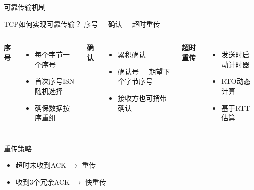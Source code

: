 \documentclass[10pt, aspectratio=169]{beamer}
\begin{document}
\begin{frame}{可靠传输机制}
    \begin{block}{TCP如何实现可靠传输？}
        序号 + 确认 + 超时重传
    \end{block}
    \vspace{0.3em}
    \begin{columns}[t]
        \textbf{序号}
        \begin{itemize}
            \item 每个字节一个序号
            \item 首次序号ISN随机选择
            \item 确保数据按序重组
        \end{itemize}
        \textbf{确认}
        \begin{itemize}
            \item 累积确认
            \item 确认号 = 期望下个字节序号
            \item 接收方也可捎带确认
        \end{itemize}
        \textbf{超时重传}
        \begin{itemize}
            \item 发送时启动计时器
            \item RTO动态计算
            \item 基于RTT估算
        \end{itemize}
    \end{columns}
    \vspace{0.5em}
    \begin{exampleblock}{重传策略}
        \begin{itemize}
            \item 超时未收到ACK $\rightarrow$ 重传
            \item 收到3个冗余ACK $\rightarrow$ 快重传
        \end{itemize}
    \end{exampleblock}
\end{frame}
\end{document}
